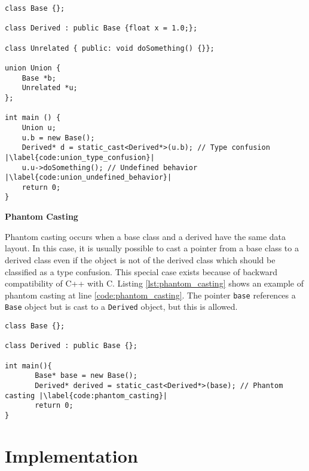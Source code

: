 \documentclass[a4paper,11pt,oneside]{report}
\begin{document}
\begin{listing}
       \begin{verbatim}
class Base {};

class Derived : public Base {float x = 1.0;};

class Unrelated { public: void doSomething() {}};

union Union {
    Base *b;
    Unrelated *u;
};

int main () {
    Union u;
    u.b = new Base(); 
    Derived* d = static_cast<Derived*>(u.b); // Type confusion |\label{code:union_type_confusion}|
    u.u->doSomething(); // Undefined behavior |\label{code:union_undefined_behavior}|
    return 0;
}
       \end{verbatim}
       \caption{Union example}
       \label{lst:union}
\end{listing}

\textbf{Phantom Casting}

\noindent{}Phantom casting occurs when a base class and a derived have the same
data layout.  In this case, it is usually possible to cast a pointer from a base class
to a derived class even if the object is not of the derived class which should
be classified as a type confusion.  This special case exists because of backward
compatibility of C++ with C. Listing \autoref{lst:phantom_casting} shows an
example of phantom casting at line \ref{code:phantom_casting}.  The pointer
\texttt{base} references a \texttt{Base} object but is cast to a
\texttt{Derived} object, but this is allowed.

\begin{listing}
       \begin{verbatim}
class Base {};

class Derived : public Base {};

int main(){
       Base* base = new Base();
       Derived* derived = static_cast<Derived*>(base); // Phantom casting |\label{code:phantom_casting}|
       return 0;
} 
       \end{verbatim}
       \caption{Phantom casting example}
       \label{lst:phantom_casting}

\end{listing}

\chapter{Implementation}
\end{document}
